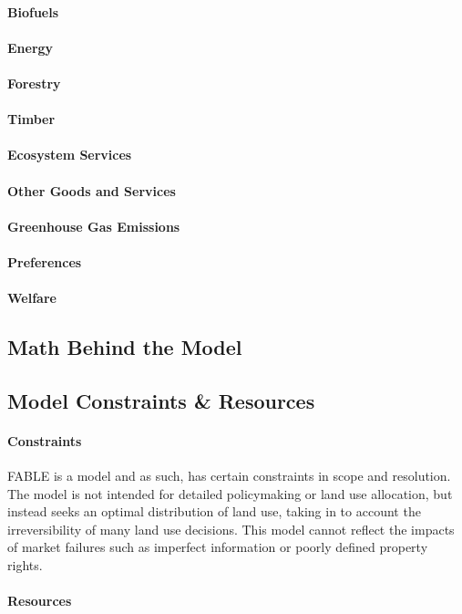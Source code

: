 \documentclass[10pt]{article}
\begin{document}
\paragraph{Biofuels}
\paragraph{Energy}
\paragraph{Forestry}
\paragraph{Timber}
\paragraph{Ecosystem Services}
\paragraph{Other Goods and Services}
\paragraph{Greenhouse Gas Emissions}
\paragraph{Preferences}
\paragraph{Welfare}



\subsection{Math Behind the Model}

\subsection{Model Constraints \& Resources}
\paragraph{Constraints}
FABLE is a model and as such, has certain constraints in scope and resolution. The model is not intended for detailed policymaking or land use allocation, but instead seeks an optimal distribution of land use, taking in to account the irreversibility of many land use decisions. This model cannot reflect the impacts of market failures such as imperfect information or poorly defined property rights.
\paragraph{Resources}
\end{document}
